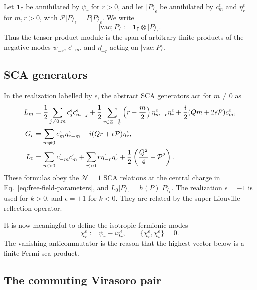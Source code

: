 \documentclass[11pt]{article}
\newcommand{\Ff}{\mathsf F}
\newcommand{\one}{\mathbf 1}
\begin{document}
Let \(\one_{\Ff}\) be annihilated by \(\psi_r\) for \(r>0\), and let
\(\lvert P\rangle_\epsilon\) be annihilated by \(c_m^\epsilon\) and
\(\eta_r^\epsilon\) for \(m,r>0\), with
\(\mathcal P\lvert P\rangle_\epsilon=P\lvert P\rangle_\epsilon\).  We write
\begin{equation}
 \lvert\mathrm{vac};P\rangle
 :=\one_{\Ff}\otimes\lvert P\rangle_\epsilon.
 \label{eq:free-field-vacuum}
\end{equation}
Thus the tensor-product module is the span of arbitrary finite products of
the negative modes \(\psi_{-r}\), \(c_{-m}^\epsilon\), and
\(\eta_{-r}^\epsilon\) acting on
\(\lvert\mathrm{vac};P\rangle\).

\subsection{SCA generators}

In the realization labelled by \(\epsilon\), the abstract SCA generators act
for \(m\ne0\) as
\begin{align}
 L_m
 &=\frac12\sum_{j\ne0,m}c_j^\epsilon c_{m-j}^\epsilon
  +\frac12\sum_{r\in\mathbb Z+\frac12}
       \left(r-\frac m2\right)
       \eta_{m-r}^\epsilon\eta_r^\epsilon
  +\frac i2(Qm+2\epsilon\mathcal P)c_m^\epsilon,
 \notag\\
 G_r
 &=\sum_{m\ne0}c_m^\epsilon\eta_{r-m}^\epsilon
   +i(Qr+\epsilon\mathcal P)\eta_r^\epsilon,
 \label{eq:free-field-SCA}\\
 L_0
 &=\sum_{m>0}c_{-m}^\epsilon c_m^\epsilon
   +\sum_{r>0}r\eta_{-r}^\epsilon\eta_r^\epsilon
   +\frac12\left(\frac{Q^2}{4}-\mathcal P^2\right).
 \notag
\end{align}
These formulas obey the \(\mathcal N=1\) SCA relations at the central charge
in Eq.~\eqref{eq:free-field-parameters}, and
\(L_0\lvert P\rangle_\epsilon=h(P)\lvert P\rangle_\epsilon\).
The realization \(\epsilon=-1\) is used for \(k>0\), and
\(\epsilon=+1\) for \(k<0\).  They are related by the super-Liouville
reflection operator.

It is now meaningful to define the isotropic fermionic modes
\begin{equation}
 \chi_r^\epsilon:=\psi_r-i\eta_r^\epsilon,
 \qquad
 \{\chi_r^\epsilon,\chi_s^\epsilon\}=0.
 \label{eq:chi-definition}
\end{equation}
The vanishing anticommutator is the reason that the highest vector below is a
finite Fermi-sea product.

\subsection{The commuting Virasoro pair}
\end{document}

